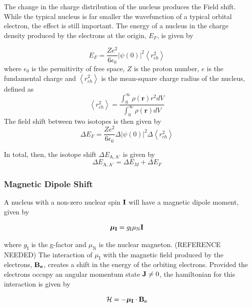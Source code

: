 \documentclass[12pt,a4paper,margin=1in]{report}
\begin{document}
The change in the charge distribution of the nucleus produces the Field shift. While the typical nucleus is far smaller the wavefunction of a typical orbital electron, the effect is still important. The energy of a nucleus in the charge density produced by the electrons at the origin, $E_F$, is given by

\begin{equation}
E_F = \frac{Ze^2}{6 \epsilon_0}|\psi(0)|^2 \left\langle r_{ch}^2\right\rangle
\end{equation}
where $\epsilon_0$ is the permitivity of free space, $Z$ is the proton number, $e$ is the fundamental charge and $ \left\langle r_{ch}^2\right\rangle$ is the mean-square charge radius of the nucleus, defined as
\begin{equation}
 \left\langle r_{ch}^2\right\rangle = \frac{\int_0^{\infty}\rho(\mathbf{r})r^2dV}{\int_0^{\infty}\rho(\mathbf{r})dV}
\end{equation}
The field shift between two isotopes is then given by
\begin{equation}
\Delta E_F =  \frac{Ze^2}{6 \epsilon_0}\Delta|\psi(0)|^2 \Delta\left\langle r_{ch}^2\right\rangle
\end{equation}

In total, then, the isotope shift $\Delta E_{\mathrm{A,A}'}$ is given by
\begin{equation}
 \Delta E_{\mathrm{A,A'}} = \Delta E_M + \Delta E_F
\end{equation}
\subsubsection*{Magnetic Dipole Shift}
A nucleus with a non-zero nuclear spin $\bf{I}$  will have a magnetic dipole moment, given by

\begin{equation}
\boldsymbol{\mu}_{\mathrm{\bf{I}}} = g_{\mathrm{I}}\mu_{\mathrm{N}}\mathrm{\bf{I}}
\end{equation}

where $g_{\mathrm{I}}$ is the g-factor and $\mu_{\mathrm{N}}$ is the nuclear magneton. (REFERENCE NEEDED) The interaction of $\mu_{\mathrm{I}}$ with the magnetic field produced by the electrons, $\mathrm{\bf{B_e}}$, creates a shift in the energy of the orbiting electrons. Provided the electrons occupy an angular momentum state $\mathrm{\bf{J}} \neq 0$, the hamiltonian for this interaction is given by

\begin{equation}
\mathcal{H} = -\boldsymbol{\mu}_{\mathrm{\bf{I}}} \cdot \mathrm{\bf{B_e}}
\end{equation}
\end{document}
